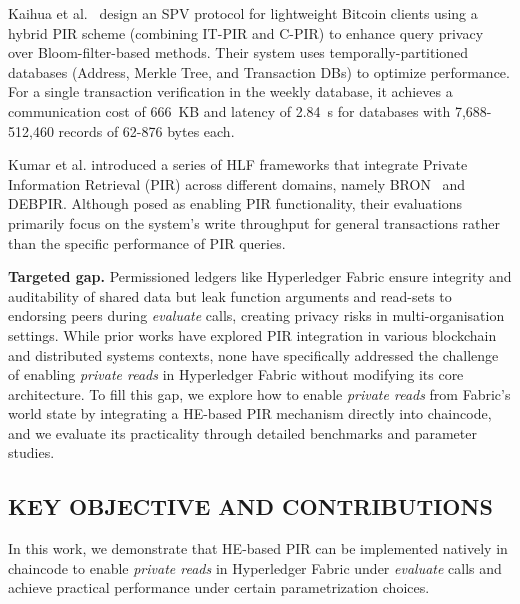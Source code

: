 \documentclass[letterpaper,journal]{IEEEtran}
\begin{document}
Kaihua et al.~\cite{Kaihua2019applying} design an SPV protocol for lightweight Bitcoin clients using a hybrid PIR scheme (combining IT-PIR and C-PIR)
to enhance query privacy over Bloom-filter-based methods. Their system uses temporally-partitioned databases (Address, Merkle Tree, and Transaction DBs) 
to optimize performance. For a single transaction verification in the weekly database, it achieves a communication cost of 666~KB and 
latency of 2.84~s for databases with 7,688-512,460 records of 62-876 bytes each.

Kumar et al. introduced a series of HLF frameworks that integrate Private Information Retrieval (PIR) across different domains, 
namely BRON~\cite{kumar_bron_2024} and DEBPIR\cite{kumar_debpir_2025}. Although posed as enabling PIR functionality,
their evaluations primarily focus on the system's write throughput for general transactions rather than the specific performance of PIR queries.

\textbf{Targeted gap.}
Permissioned ledgers like Hyperledger Fabric ensure integrity and auditability of shared data but leak function arguments and read-sets
to endorsing peers during \emph{evaluate} calls, creating privacy risks in multi-organisation settings.
While prior works have explored PIR integration in various blockchain and distributed systems contexts,
none have specifically addressed the challenge of enabling \emph{private reads} in Hyperledger Fabric without modifying its core architecture.
To fill this gap, we explore how to enable \emph{private reads} from Fabric’s world state by integrating a HE-based PIR mechanism directly into chaincode, 
and we evaluate its practicality through detailed benchmarks and parameter studies.

\subsection{KEY OBJECTIVE AND CONTRIBUTIONS}
In this work, we demonstrate that HE-based PIR can be implemented natively in chaincode to enable \emph{private reads} in 
Hyperledger Fabric under \emph{evaluate} calls and achieve practical performance under certain parametrization choices.
\end{document}
